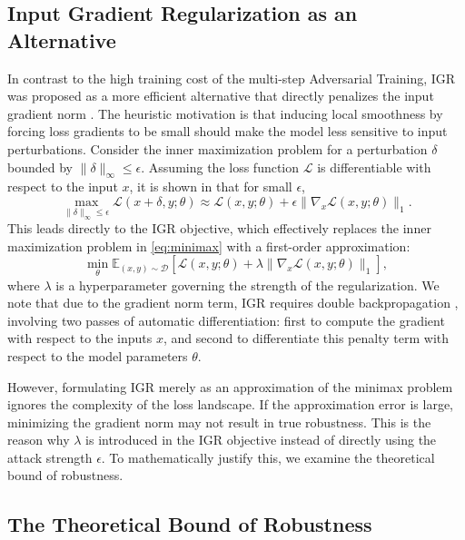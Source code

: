 \documentclass{article}
\begin{document}
\subsection{Input Gradient Regularization as an Alternative}

In contrast to the high training cost of the multi-step Adversarial Training, IGR was proposed as a more efficient alternative that directly penalizes the input gradient norm \cite{7373334, ross2017improvingadversarialrobustnessinterpretability, ororbia2016unifyingadversarialtrainingalgorithms}. The heuristic motivation is that inducing local smoothness by forcing loss gradients to be small should make the model less sensitive to input perturbations. Consider the inner maximization problem for a perturbation $\delta$ bounded by $\|\delta\|_{\infty} \leq \epsilon$. Assuming the loss function $\mathcal{L}$ is differentiable with respect to the input $x$, it is shown in \cite{simongabriel2019firstorderadversarialvulnerabilityneural} that for small $\epsilon$, 
\[
  \max_{\|\delta\|_{\infty} \leq \epsilon} \mathcal{L}(x + \delta, y; \theta) \approx \mathcal{L}(x, y; \theta) + \epsilon\|\nabla_x \mathcal{L}(x, y; \theta)\|_{1}.
\]
This leads directly to the IGR objective, which effectively replaces the inner maximization problem in \eqref{eq:minimax} with a first-order approximation:
\begin{equation}
  \min_{\theta} \mathbb{E}_{(x, y) \sim \mathcal{D}}[\mathcal{L}(x, y; \theta) + \lambda\|\nabla_x \mathcal{L}(x, y; \theta)\|_1],
  \label{eq:igr}
\end{equation}
where $\lambda$ is a hyperparameter governing the strength of the regularization. We note that due to the gradient norm term, IGR requires double backpropagation \cite{doublebackpropagation}, involving two passes of automatic differentiation: first to compute the gradient with respect to the inputs $x$, and second to differentiate this penalty term with respect to the model parameters $\theta$.

However, formulating IGR merely as an approximation of the minimax problem ignores the complexity of the loss landscape. If the approximation error is large, minimizing the gradient norm may not result in true robustness. This is the reason why $\lambda$ is introduced in the IGR objective instead of directly using the attack strength $\epsilon$. To mathematically justify this, we examine the theoretical bound of robustness.

\subsection{The Theoretical Bound of Robustness}
\end{document}
